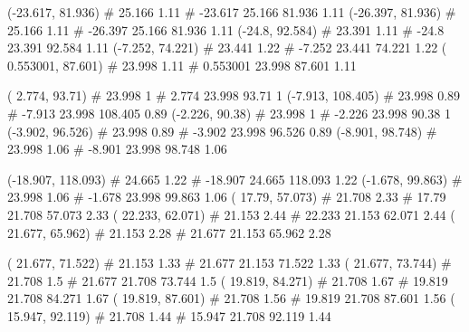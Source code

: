\documentclass[a4paper,openbib,10pt]{article}
\newenvironment{treegraph}{\begin{graph}}{\end{graph}}
\begin{document}
\begin{treegraph}
  (-23.617, 81.936) #     25.166    1.11
   #    -23.617    25.166    81.936    1.11
  (-26.397, 81.936) #     25.166    1.11
   #    -26.397    25.166    81.936    1.11
  (-24.8, 92.584) #     23.391    1.11
   #    -24.8    23.391    92.584    1.11
  (-7.252, 74.221) #     23.441    1.22
   #    -7.252    23.441    74.221    1.22
  ( 0.553001, 87.601) #     23.998    1.11
   #    0.553001    23.998    87.601    1.11

  ( 2.774, 93.71) #     23.998    1
   #    2.774    23.998    93.71    1
  (-7.913, 108.405) #     23.998    0.89
   #    -7.913    23.998    108.405    0.89
  (-2.226, 90.38) #     23.998    1
   #    -2.226    23.998    90.38    1
  (-3.902, 96.526) #     23.998    0.89
   #    -3.902    23.998    96.526    0.89
  (-8.901, 98.748) #     23.998    1.06
   #    -8.901    23.998    98.748    1.06

  (-18.907, 118.093) #     24.665    1.22
   #    -18.907    24.665    118.093    1.22
  (-1.678, 99.863) #     23.998    1.06
   #    -1.678    23.998    99.863    1.06
  ( 17.79, 57.073) #     21.708    2.33
   #    17.79    21.708    57.073    2.33
  ( 22.233, 62.071) #     21.153    2.44
   #    22.233    21.153    62.071    2.44
  ( 21.677, 65.962) #     21.153    2.28
   #    21.677    21.153    65.962    2.28

  ( 21.677, 71.522) #     21.153    1.33
   #    21.677    21.153    71.522    1.33
  ( 21.677, 73.744) #     21.708    1.5
   #    21.677    21.708    73.744    1.5
  ( 19.819, 84.271) #     21.708    1.67
   #    19.819    21.708    84.271    1.67
  ( 19.819, 87.601) #     21.708    1.56
   #    19.819    21.708    87.601    1.56
  ( 15.947, 92.119) #     21.708    1.44
   #    15.947    21.708    92.119    1.44


\end{treegraph}
\end{document}
